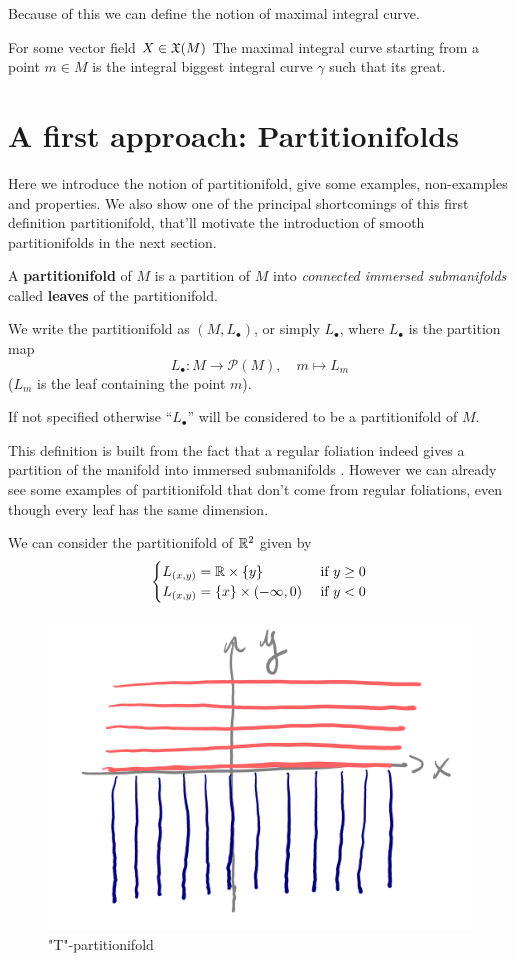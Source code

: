 	Because of this we can define the notion of maximal integral curve.

	\begin{definition}
		For some vector field $X \in \mathfrak{X}(M)$ The maximal integral curve starting from a point $m \in M$ is the integral biggest integral curve $\gamma$ such that its great.
	\end{definition}


\section{A first approach: Partitionifolds}

	Here we introduce the notion of partitionifold, give some examples, non-examples and properties. We also show one of the principal shortcomings of this first definition partitionifold, that'll motivate the introduction of smooth partitionifolds in the next section.

	\begin{definition}
		A \textbf{partitionifold} of $M$ is a partition of $M$ into \emph{connected immersed submanifolds} called \textbf{leaves} of the partitionifold.

		We write the partitionifold as $(M, L_\bullet)$, or simply $L_\bullet$, where $L_\bullet$ is the partition map
		$$
			L_\bullet : M \to \mathcal{P}(M), \quad m \mapsto L_m
		$$
		($L_m$ is the leaf containing the point $m$).

		If not specified otherwise ``$L_\bullet$'' will be considered to be a partitionifold of $M$.
	\end{definition}

	This definition is built from the fact that a regular foliation indeed gives a partition of the manifold into immersed submanifolds . However we can already see some examples of partitionifold that don't come from regular foliations, even though every leaf has the same dimension.

	\begin{example}[``T'' partitionifold]
		We can consider the partitionifold of $\mathbb{R}^2$ given by
		$$
		\begin{cases}
			L_{(x,y)} = \mathbb{R} \times \{y\}            &\text{ if } y \geq 0 \\
			L_{(x,y)} = \{x\} \times (-\infty, 0)  &\text{ if } y < 0
		\end{cases}
		$$

		\begin{figure}[H]
		    \centering
		    \includegraphics[width=0.5\linewidth]{T-foliation.png}
		    \caption{"T"-partitionifold}
		    \label{fig:enter-label}
		\end{figure}
	\end{example}

